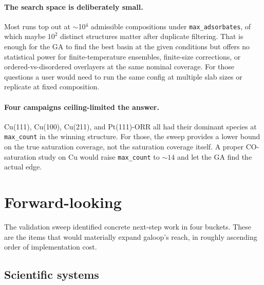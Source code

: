 \documentclass[11pt,letterpaper]{article}
\begin{document}
\paragraph{The search space is deliberately small.} Most runs top out
at $\sim$10$^4$ admissible compositions under
\texttt{max\_adsorbates}, of which maybe $10^2$ distinct structures
matter after duplicate filtering. That is enough for the GA to find
the best basin at the given conditions but offers no statistical
power for finite-temperature ensembles, finite-size corrections, or
ordered-vs-disordered overlayers at the same nominal coverage. For
those questions a user would need to run the same config at multiple
slab sizes or replicate at fixed composition.

\paragraph{Four campaigns ceiling-limited the answer.} Cu(111),
Cu(100), Cu(211), and Pt(111)-ORR all had their dominant species at
\texttt{max\_count} in the winning structure. For those, the sweep
provides a lower bound on the true saturation coverage, not the
saturation coverage itself. A proper CO-saturation study on Cu would
raise \texttt{max\_count} to $\sim 14$ and let the GA find the
actual edge.

\section{Forward-looking}
\label{sec:forward}

The validation sweep identified concrete next-step work in four
buckets. These are the items that would materially expand galoop's
reach, in roughly ascending order of implementation cost.

\subsection{Scientific systems}
\end{document}
